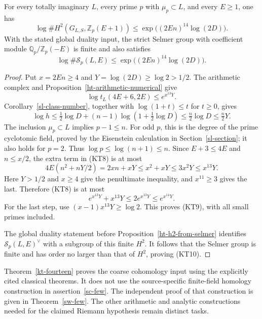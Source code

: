 \begin{theorem}\label{kt-fourteen}
For every totally imaginary \(L\), every prime \(p\)
with \(\mu_p\subset L\), and every \(E\ge1\), one has
\[
 \log\#H^2(G_{L,S},\mathbb Z_p(E+1))
       \le\exp\bigl((2En)^{14}\log(2D)\bigr).
 \tag{KT9}
\]
With the stated global duality input, the strict Selmer
group with coefficient module
\(\mathbb Q_p/\mathbb Z_p(-E)\) is finite and also satisfies
\[
        \log\#\mathcal S_p(L,E)
            \le\exp\bigl((2En)^{14}\log(2D)\bigr).
 \tag{KT10}
\]
\end{theorem}
\begin{proof}
Put \(x=2En\ge4\) and \(Y=\log(2D)\ge\log2>1/2\).
The arithmetic complex and
Proposition~\ref{ht-arithmetic-numerical} give
\[
                 \log t_L(4E+6,2E)\le e^{x^{13}Y}.
\]
Corollary~\ref{sl-class-number}, together with
\(\log(1+t)\le t\) for \(t\ge0\), gives
\[
 \log h\le\tfrac12\log D
        +(n-1)\log(1+\tfrac12\log D)
            \le\tfrac n2\log D\le\tfrac n2Y.
\]
The inclusion \(\mu_p\subset L\) implies \(p-1\le n\).
For odd \(p\), this is the degree of the prime cyclotomic
field, proved by the Eisenstein calculation in
Section~\ref{sl-section}; it also holds for \(p=2\).
Thus \(\log p\le\log(n+1)\le n\).
Since \(E+3\le4E\) and \(n\le x/2\), the extra term in
(KT8) is at most
\[
 4E(n^2+nY/2)=2xn+xY
       \le x^2+xY\le3x^2Y\le x^{13}Y.
\]
Here \(Y>1/2\) and \(x\ge4\) give the penultimate
inequality, and \(x^{11}\ge3\) gives the last.
Therefore (KT8) is at most
\[
 e^{x^{13}Y}+x^{13}Y
       \le2e^{x^{13}Y}\le e^{x^{14}Y}.
\]
For the last step, use
\((x-1)x^{13}Y\ge\log2\).
This proves (KT9), with all small primes included.

The global duality statement before
Proposition~\ref{ht-h2-from-selmer} identifies
\(\mathcal S_p(L,E)^\vee\) with a subgroup of this
finite \(H^2\).  It follows that the Selmer group is
finite and has order no larger than that of \(H^2\),
proving (KT10).
\end{proof}

Theorem~\ref{kt-fourteen} proves the coarse cohomology
input using the explicitly cited classical theorems.
It does not use the source-specific finite-field
homology construction in assertion~\ref{sc-few}.
The independent proof of that construction is given in
Theorem~\ref{sw-few}.  The other arithmetic and analytic
constructions needed for the claimed Riemann hypothesis
remain distinct tasks.

